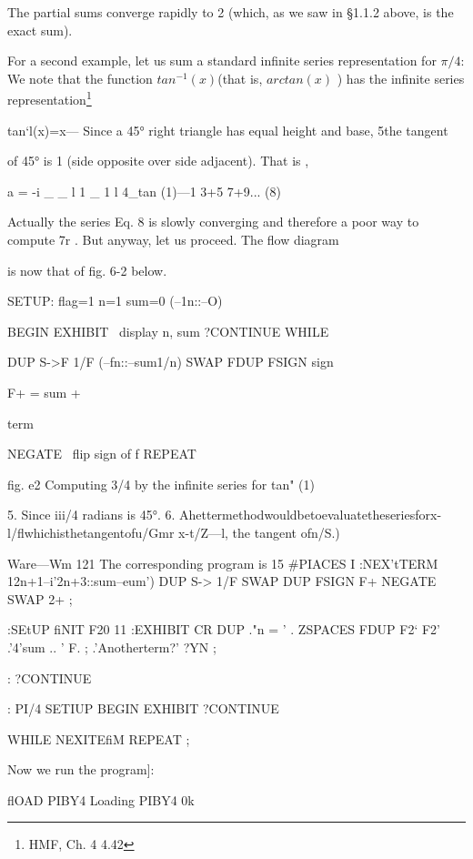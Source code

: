 The partial sums converge rapidly to 2 (which, as we saw in §1.1.2 above, is the exact sum).

For a second example, let us sum a standard infinite series representation for $\pi/4$: We note that the function $tan^{-1}(x)$(that is, $arctan(x)$ ) has the infinite series representation\footnote{HMF, Ch. 4 4.42}

tan‘l(x)=x—%
Since a 45° right triangle has equal height and base, 5the tangent

of 45° is 1 (side opposite over side adjacent). That is ,

a = -i _ _ l 1 _ 1 l
4_tan (1)—1 3+5 7+9... (8)

Actually the series Eq. 8 is slowly converging and therefore a poor
way to compute 7r . But anyway, let us proceed. The flow diagram

is now that of fig. 6-2 below.

 

SETUP: flag=1 n=1 sum=0 (--1n::--O)

BEGIN
EXHIBIT \ display n, sum
?CONTINUE WHILE

DUP S->F 1/F (--fn::--sum1/n)
SWAP FDUP FSIGN \transfer sign

 

 

F+ \sum = sum +

term

NEGATE \ flip sign of f
REPEAT

 

 

 

fig. e2 Computing 3/4 by the infinite series for tan" (1)

 

5. Since iii/4 radians is 45°.
6. Ahettermethodwouldbetoevaluatetheseriesforx-l/flwhichisthetangentofu/Gmr
x-t/Z—l, the tangent ofn/S.)

Ware—Wm 121
The corresponding program is
15 #PIACES I \eetEtoiSdigits
:NEX'tTERM 12n+1--i'2n+3::sum--eum')
DUP S-> 1/F SWAP DUP FSIGN F+
NEGATE SWAP 2+ ;

:SEtUP fiNIT F20 11
:EXHIBIT CR DUP
."n = ' . ZSPACES
FDUP F2‘ F2' .'4'sum .. ' F. ;
.'Anotherterm?' ?YN ;

: ?CONTINUE

: PI/4 SETIUP
BEGIN EXHIBIT
?CONTINUE

WHILE NEXITEfiM REPEAT ;

Now we run the program]:

flOAD PIBY4 Loading PIBY4 0k

